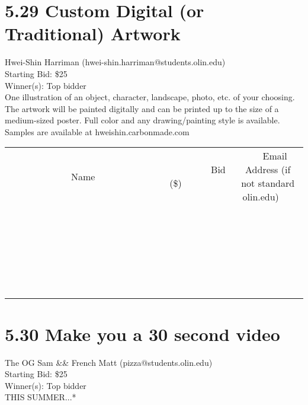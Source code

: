 \documentclass[11pt]{article}
\begin{document}
\section*{5.29 Custom Digital (or Traditional) Artwork}
Hwei-Shin Harriman (hwei-shin.harriman@students.olin.edu) \\
Starting Bid: \$25 \\
Winner(s): 
Top bidder \\
One illustration of an object, character, landscape, photo, etc. of your choosing. The artwork will be painted digitally and can be printed up to the size of a medium-sized poster. Full color and any drawing/painting style is available. Samples are available at hweishin.carbonmade.com \\[6ex]
\begin{tabular}{c c c}
~~~~~~~~~~~~~Name~~~~~~~~~~~~~ & ~~~~~~~~~Bid (\$)~~~~~~~~~ & ~~~Email Address (if not standard olin.edu)~~~ \\
 & & \\
\hline
 & & \\
\hline
 & & \\
\hline
 & & \\
\hline
 & & \\
\hline
 & & \\
\hline
 & & \\
\hline
 & & \\
\hline
 & & \\
\hline
 & & \\
\hline
 & & \\
\hline
 & & \\
\hline
 & & \\
\hline
 & & \\
\hline
 & & \\
\hline
 & & \\
\hline
 & & \\
\hline
 & & \\
\hline
 & & \\
\hline
 & & \\
\hline
 & & \\
\hline
 & & \\
\hline
 & & \\
\hline
 & & \\
\hline
 & & \\
\hline
 & & \\
\hline
\end{tabular}
\clearpage
\section*{5.30 Make you a 30 second video}
The OG Sam \&\& French Matt (pizza@students.olin.edu) \\
Starting Bid: \$25 \\
Winner(s): 
Top bidder \\
THIS SUMMER...*
\end{document}
